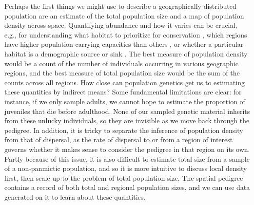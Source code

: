\documentclass{ar-1col}
\begin{document}
Perhaps the first things we might use
to describe a geographically distributed population
are an estimate of the total population size
and a map of population density across space.
Quantifying abundance and how it varies
can be crucial, e.g., for understanding
what habitat to prioritize for conservation \citep{zipkin2018synthesizing}, 
which regions have higher population carrying capacities than others \citep{roughgarden1974}, 
or whether a particular habitat is a demographic source or sink 
\citep{pulliam1988sources}.
The best measure of population density
would be a count of the number of individuals occurring in various geographic regions, 
and the best measure of total population size would be the sum of the counts across all regions.
How close can population genetics get us to estimating these quantities by indirect means?
Some fundamental limitations are clear:
for instance, if we only sample adults,
we cannot hope to estimate the proportion of juveniles that die before adulthood.
None of our sampled genetic material inherits from these unlucky individuals,
so they are invisible as we move back through the pedigree.
In addition, it is tricky to separate the inference of population density 
from that of dispersal, 
as the rate of dispersal to or from a region of interest 
governs whether it makes sense to consider the pedigree in that region on its own.
Partly because of this issue, 
it is also difficult to estimate total size from a sample of a 
non-panmictic population, 
and so it is more intuitive to discuss local density first, 
then scale up to the problem of total population size.
The spatial pedigree contains a record of both total and regional population sizes, 
and we can use data generated on it to learn about these quantities.
\end{document}
